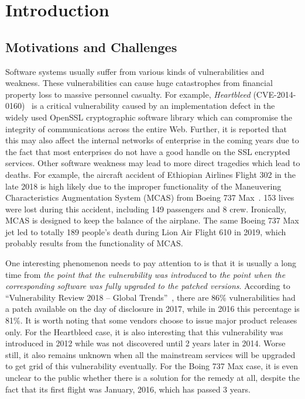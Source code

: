 
\chapter{Introduction} \label{ch:introduction}


\section{Motivations and Challenges}
Software systems usually suffer from various kinds of vulnerabilities and weakness. These vulnerabilities can cause huge catastrophes from financial property loss to massive personnel casualty. For example, \emph{Heartbleed} (CVE-2014-0160)~\cite{heartbleed} is a critical vulnerability caused by an implementation defect in the widely used OpenSSL cryptographic software library which can compromise the integrity of communications across the entire Web. Further, it is reported that this may also affect the internal networks of enterprise in the coming years due to the fact that most enterprises do not have a good handle on the SSL encrypted services. Other software weakness may lead to more direct tragedies which lead to deaths. For example, the aircraft accident of Ethiopian Airlines Flight 302 in the late 2018 is high likely due to the improper functionality of the Maneuvering Characteristics Augmentation System (MCAS) from Boeing 737 Max~\cite{boeing_Ethiopian}. 153 lives were lost during this accident, including 149 passengers and 8 crew. Ironically, MCAS is designed to keep the balance of the airplane. The same Boeing 737 Max jet led to totally 189 people's death during Lion Air Flight 610 in 2019, which probably results from the functionality of MCAS.

One interesting phenomenon needs to pay attention to is that it is usually a long time from \emph{the point that the vulnerability was introduced} to \emph{the point when the corresponding software was fully upgraded to the patched versions}. According to ``Vulnerability Review 2018 -- Global Trends''~\cite{vul_flexera18}, there are 86\% vulnerabilities had a patch available on the day of disclosure in 2017, while in 2016 this percentage is 81\%. It is worth noting that some vendors choose to issue major product releases only. For the Heartbleed case, it is also interesting that this vulnerability was introduced in 2012 while was not discovered until 2 years later in 2014. Worse still, it also remains unknown when all the mainstream services will be upgraded to get grid of this vulnerability eventually. For the Boing 737 Max case, it is even unclear to the public whether there is a solution for the remedy at all, despite the fact that its first flight was January, 2016, which has passed 3 years.

